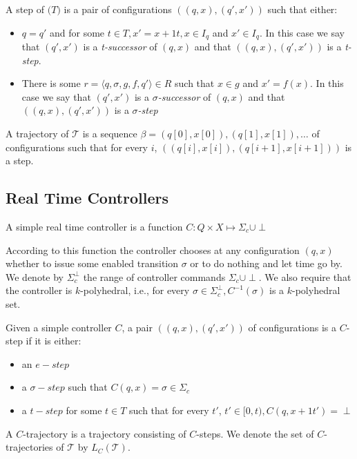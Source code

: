 \documentclass[table]{beamer}
\newcommand{\confPair}{\ensuremath{((q,x),(q',x'))}}
\begin{document}
\begin{frame}
	\begin{dfn}
		A step of $\mathcal(T)$ is a pair of configurations $\confPair$ such that either:
		\begin{itemize}
			\item $q=q'$ and for some $t \in T, x'=x+1t, x \in I_q$ and $x' \in I_q$. In this case we say that $(q',x')$ is a \emph{t-successor} of $(q,x)$ and that $\confPair$ is a \emph{t-step}.
			\item There is some $r = \langle q,\sigma,g,f,q'\rangle \in R$ such that $x \in g$ and $x' = f(x)$. In this case we say that $(q',x')$ is a \emph{$\sigma$-successor} of $(q,x)$ and that $\confPair$ is a \emph{$\sigma$-step} 
		\end{itemize}
		
		\medskip
		
		A trajectory of $\mathcal{T}$ is a sequence $ \beta = (q[0],x[0]),(q[1],x[1]),\ldots $ of configurations such that for every $i$, $((q[i],x[i]),(q[i+1],x[i+1]))$ is a step.
	\end{dfn}
\end{frame}

\subsection{Real Time Controllers}
\begin{frame}
	\begin{dfn}
		A simple real time controller is a function $C: Q \times X \mapsto \Sigma_c \cup {\perp}$
	\end{dfn}
	According to this function the controller chooses at any configuration $(q,x)$ whether to issue some enabled transition $\sigma$ or to do nothing and let time go by. We denote by $\Sigma_c^\perp$ the range of controller commands $\Sigma_c \cup {\perp}$. We also require that the controller is $k$-polyhedral, i.e., for every $\sigma \in \Sigma_c^\perp, C^{-1}(\sigma)$ is  a $k$-polyhedral set.
\end{frame}

\begin{frame}
	\begin{dfn}
		Given a simple controller $C$, a pair $\confPair$ of configurations is a $C$-step if it is either:
		\begin{itemize}
			\item an $e-step$ 
			\item a $\sigma-step$ such that $C(q,x)=\sigma \in \Sigma_c$
			\item a $t-step$ for some $t \in T$ such that for every $t'$, $t' \in [0,t), C(q,x+1t')=\perp$
		\end{itemize}
	\end{dfn}
	A $C$-trajectory is a trajectory consisting of $C$-steps. We denote the set of $C$-trajectories of $\mathcal{T}$ by $L_C(\mathcal{T})$.
\end{frame}
\end{document}
